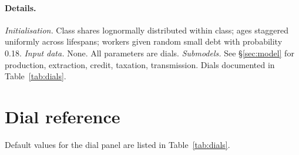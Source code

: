 \documentclass[11pt]{article}
\begin{document}
\paragraph{Details.}
\emph{Initialisation.} Class shares lognormally distributed within
class; ages staggered uniformly across lifespans; workers given
random small debt with probability 0.18.
\emph{Input data.} None. All parameters are dials.
\emph{Submodels.} See \S\ref{sec:model} for production, extraction,
credit, taxation, transmission. Dials documented in
Table~\ref{tab:dials}.

\section{Dial reference}
\label{app:dials}

Default values for the dial panel are listed in Table~\ref{tab:dials}.
\end{document}
